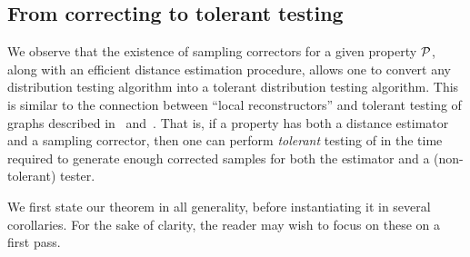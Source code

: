 \subsection{From correcting to tolerant testing}

We observe that the existence of sampling 
correctors for a given property $\mathcal{P}$, 
along with an efficient distance estimation procedure, 
allows one to convert any distribution testing algorithm into a tolerant 
distribution testing algorithm.
This is similar to the connection between ``local reconstructors'' and 
tolerant testing of graphs described in~\cite[Theorem 3.1]{Brakerski:08}
and~\cite[Theorem 3.1]{CGR:12}. That is, 
if a property \property has both a distance estimator and a sampling corrector, 
then one can perform \emph{tolerant} testing of \property in the time 
required to generate enough corrected samples for both the estimator and a 
(non-tolerant) tester. \medskip

We first state our theorem in all generality, 
before instantiating it in several corollaries. For the sake of clarity,
the reader may wish to focus on these on a first pass.

